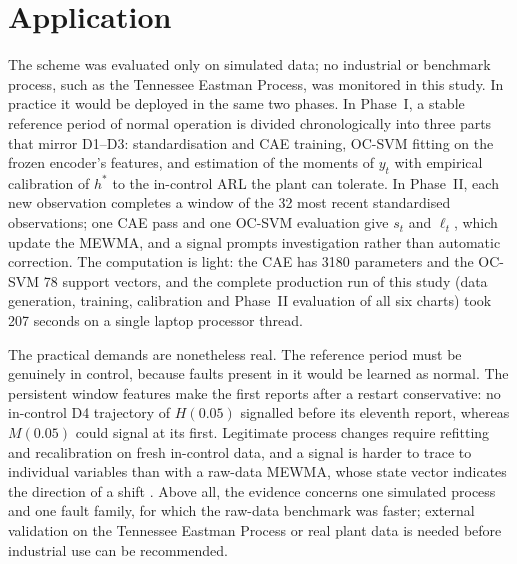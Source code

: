 \section{Application}

The scheme was evaluated only on simulated data; no industrial or benchmark process, such as the
Tennessee Eastman Process, was monitored in this study. In practice it would be deployed in the same
two phases. In Phase~I, a stable reference period of normal operation is divided chronologically into
three parts that mirror D1--D3: standardisation and CAE training, OC-SVM fitting on the frozen
encoder's features, and estimation of the moments of $y_t$ with empirical calibration of $h^*$ to the
in-control ARL the plant can tolerate. In Phase~II, each new observation completes a window of the 32
most recent standardised observations; one CAE pass and one OC-SVM evaluation give $s_t$ and
$\ell_t$, which update the MEWMA, and a signal prompts investigation rather than automatic correction.
The computation is light: the CAE has 3180 parameters and the OC-SVM 78 support vectors, and the
complete production run of this study (data generation, training, calibration and Phase~II
evaluation of all six charts) took 207 seconds on a single laptop processor thread.

The practical demands are nonetheless real. The reference period must be genuinely in control,
because faults present in it would be learned as normal. The persistent window features make the
first reports after a restart conservative: no in-control D4 trajectory of $H(0.05)$ signalled before
its eleventh report, whereas $M(0.05)$ could signal at its first. Legitimate process changes require
refitting and recalibration on fresh in-control data, and a signal is harder to trace to individual
variables than with a raw-data MEWMA, whose state vector indicates the direction of a shift
\citep{lowry_multivariate_1992}. Above all, the evidence concerns one simulated process and one fault
family, for which the raw-data benchmark was faster; external validation on the Tennessee Eastman
Process or real plant data is needed before industrial use can be recommended.
